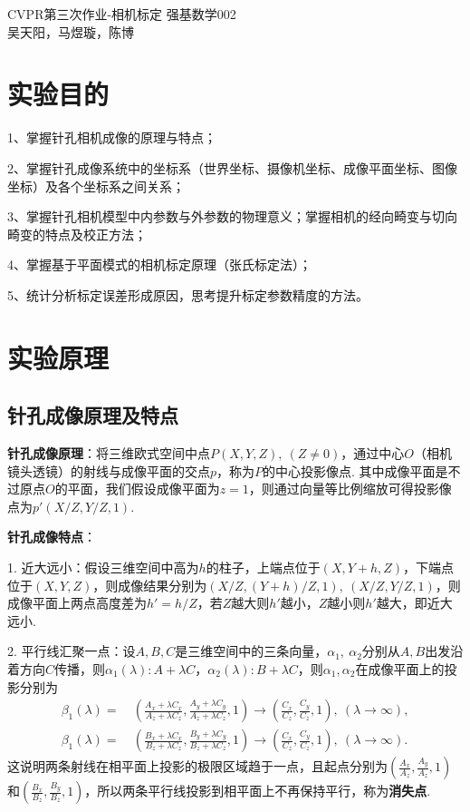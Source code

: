 \documentclass[12pt, a4paper, oneside]{ctexart}
\numberwithin{equation}{section}  %
\def\add{\vspace{1ex}}      %
\begin{document}
\begin{title}{CVPR第三次作业-相机标定}
    强基数学002\\
    吴天阳，马煜璇，陈博
\end{title}
\section{实验目的}
1、掌握针孔相机成像的原理与特点；

2、掌握针孔成像系统中的坐标系（世界坐标、摄像机坐标、成像平面坐标、图像坐标）及各个坐标系之间关系；

3、掌握针孔相机模型中内参数与外参数的物理意义；掌握相机的经向畸变与切向畸变的特点及校正方法；

4、掌握基于平面模式的相机标定原理（张氏标定法）；

5、统计分析标定误差形成原因，思考提升标定参数精度的方法。
\section{实验原理}
\subsection{针孔成像原理及特点}
\textbf{针孔成像原理}：将三维欧式空间中点$P(X,Y,Z),\ (Z\neq 0)$，通过中心$O$（相机镜头透镜）的射线与成像平面的交点$p$，称为$P$的中心投影像点. 其中成像平面是不过原点$O$的平面，我们假设成像平面为$z=1$，则通过向量等比例缩放可得投影像点为$p'(X/Z,Y/Z,1)$.

\textbf{针孔成像特点}：

1. 近大远小：假设三维空间中高为$h$的柱子，上端点位于$(X,Y+h, Z)$，下端点位于$(X,Y,Z)$，则成像结果分别为$(X/Z,(Y+h)/Z,1),\ (X/Z,Y/Z,1)$，则成像平面上两点高度差为$h'=h/Z$，若$Z$越大则$h'$越小，$Z$越小则$h'$越大，即近大远小.

2. 平行线汇聚一点：设$A,B,C$是三维空间中的三条向量，$\alpha_1,\ \alpha_2$分别从$A,B$出发沿着方向$C$传播，则$\alpha_1(\lambda):A+\lambda C$，$\alpha_2(\lambda):B+\lambda C$，则$\alpha_1,\alpha_2$在成像平面上的投影分别为
\begin{align*}
    \beta_1(\lambda) =&\ \left(\frac{A_x+\lambda C_x}{A_z+\lambda C_z},\frac{A_y+\lambda C_y}{A_z+\lambda C_z},1\right)\to \left(\frac{C_x}{C_z},\frac{C_y}{C_z},1\right),\ (\lambda \to \infty),\\
    \beta_1(\lambda) =&\ \left(\frac{B_x+\lambda C_x}{B_z+\lambda C_z},\frac{B_y+\lambda C_y}{B_z+\lambda C_z},1\right)\to \left(\frac{C_x}{C_z},\frac{C_y}{C_z},1\right),\ (\lambda \to \infty).
\end{align*}
这说明两条射线在相平面上投影的极限区域趋于一点，且起点分别为$\left(\frac{A_x}{A_z},\frac{A_y}{A_z},1\right)$和$\left(\frac{B_x}{B_z},\frac{B_y}{B_z},1\right)$，所以两条平行线投影到相平面上不再保持平行，称为\textbf{消失点}.\add
\end{document}
